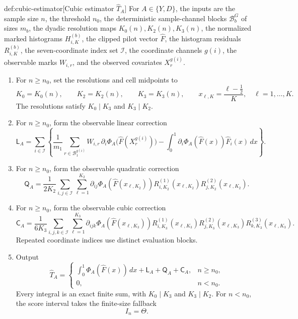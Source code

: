 \documentclass[11pt]{article}
\begin{document}
\begin{algorithmv}{def:cubic-estimator}[Cubic estimator \(\widehat T_A\)]
For \(A\in\{Y,D\}\), the inputs are the sample size \(n\), the threshold \(n_0\), the deterministic sample-channel blocks \(\mathcal B_b^G\) of sizes \(m_b\), the dyadic resolution maps \(K_0(n),K_2(n),K_3(n)\), the normalized marked histograms \(H_{i,K}^{(b)}\), the clipped pilot vector \(\widehat F\), the histogram residuals \(R_{i,K}^{(b)}\), the seven-coordinate index set \(\mathcal I\), the coordinate channels \(g(i)\), the observable marks \(W_{i,r}\), and the observed covariates \(X_r^{g(i)}\).
\begin{enumerate}
\item For \(n\ge n_0\), set the resolutions and cell midpoints to
\[
K_0=K_0(n),\qquad K_2=K_2(n),\qquad K_3=K_3(n),
\qquad
x_{\ell,K}=\frac{\ell-\tfrac12}{K},
\quad \ell=1,\ldots,K.
\]
The resolutions satisfy \(K_0\mid K_3\) and \(K_3\mid K_2\).

\item For \(n\ge n_0\), form the observable linear correction
\[
\mathsf L_A=
\sum_{i\in\mathcal I}
\left\{
\frac{1}{m_1}
\sum_{r\in\mathcal B_1^{g(i)}}
W_{i,r}\,\partial_i\Phi_A
\bigl(\widehat F(X_r^{g(i)})\bigr)
-
\int_0^1
\partial_i\Phi_A(\widehat F(x))\widehat F_i(x)\,dx
\right\}.
\]

\item For \(n\ge n_0\), form the observable quadratic correction
\[
\mathsf Q_A=
\frac{1}{2K_2}
\sum_{i,j\in\mathcal I}\sum_{\ell=1}^{K_2}
\partial_{ij}\Phi_A(\widehat F(x_{\ell,K_2}))
R_{i,K_2}^{(1)}(x_{\ell,K_2})
R_{j,K_2}^{(2)}(x_{\ell,K_2}).
\]

\item For \(n\ge n_0\), form the observable cubic correction
\[
\mathsf C_A=
\frac{1}{6K_3}
\sum_{i,j,k\in\mathcal I}\sum_{\ell=1}^{K_3}
\partial_{ijk}\Phi_A(\widehat F(x_{\ell,K_3}))
R_{i,K_3}^{(1)}(x_{\ell,K_3})
R_{j,K_3}^{(2)}(x_{\ell,K_3})
R_{k,K_3}^{(3)}(x_{\ell,K_3}).
\]
Repeated coordinate indices use distinct evaluation blocks.

\item Output
\[
\widehat T_A=
\begin{cases}
\displaystyle
\int_0^1\Phi_A(\widehat F(x))\,dx+
\mathsf L_A+\mathsf Q_A+\mathsf C_A,
& n\ge n_0,\\
0,& n<n_0.
\end{cases}
\]
Every integral is an exact finite sum, with \(K_0\mid K_3\) and \(K_3\mid K_2\). For \(n<n_0\), the score interval takes the finite-size fallback
\[
I_n=\Theta.
\]
\end{enumerate}
\end{algorithmv}
\end{document}
